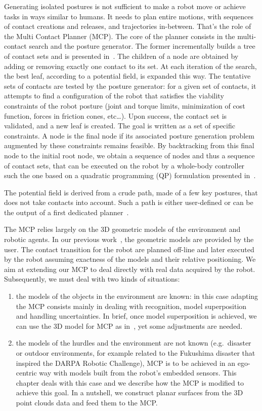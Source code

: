 Generating isolated postures is not sufficient to make a robot move or achieve tasks in ways similar to humans.
It needs to plan entire motions, with sequences of contact creations and releases, and trajectories in-between.
That's the role of the Multi Contact Planner (MCP).
The core of the planner consists in the multi-contact search and the posture generator.
The former incrementally builds a tree of contact sets and is presented in~\cite{escande:ras:2013}.
The children of a node are obtained by adding or removing exactly one contact to its set.
At each iteration of the search, the best leaf, according to a potential field, is expanded this way.
The tentative sets of contacts are tested by the posture generator: for a given set of contacts, it attempts to find a configuration of the robot that satisfies the viability constraints of the robot posture (joint and torque limits, minimization of cost function, forces in friction cones, etc\ldots).
Upon success, the contact set is validated, and a new leaf is created.
The goal is written as a set of specific constraints.
A node is the final node if its associated posture generation problem augmented by these constraints remains feasible.
By backtracking from this final node to the initial root node, we obtain a sequence of nodes and thus a sequence of contact sets, that can be executed on the robot by a whole-body controller such the one based on a quadratic programming (QP) formulation presented in~\cite{bouyarmane:iros:2011}.

The potential field is derived from a crude path, made of a few key postures, that does not take contacts into account.
Such a path is either user-defined or can be the output of a first dedicated planner~\cite{bouyarmane:icra:2009}.

The MCP relies largely on the 3D geometric models of the environment and robotic agents.
In our previous work~\cite{escande:ras:2013,bouyarmane:ar:2012}, the geometric models are provided by the user.
The contact transition for the robot are planned off-line and later executed by the robot assuming exactness of the models and their relative positioning.
We aim at extending our MCP to deal directly with real data acquired by the robot.
Subsequently, we must deal with two kinds of situations:
\begin{enumerate}
  \item the models of the objects in the environment are known: in this case adapting the MCP consists mainly in dealing with recognition, model superposition and handling uncertainties.
  In brief, once model superposition is achieved, we can use the 3D model for MCP as in~\cite{escande:ras:2013,bouyarmane:ar:2012}, yet some adjustments are needed.
  \item the models of the hurdles and the environment are not known (e.g.\ disaster or outdoor environments, for example related to the Fukushima disaster that inspired the DARPA Robotic Challenge), MCP is to be achieved in an ego-centric way with models built from the robot's embedded sensors.
  This chapter deals with this case and we describe how the MCP is modified to achieve this goal.
  In a nutshell, we construct planar surfaces from the 3D point clouds data and feed them to the MCP.\@
\end{enumerate}

